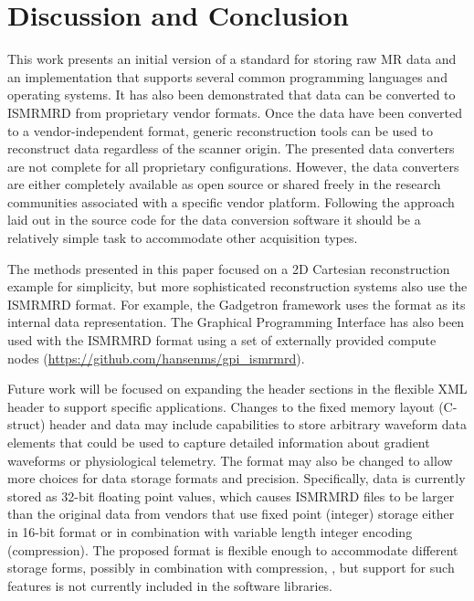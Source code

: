 \documentclass[12pt, draft]{article}
\newcommand{\madded}[2][None]{\added[remark=#1]{#2}}
\begin{document}
\section*{Discussion and Conclusion}
This work presents an initial version of a standard for storing raw MR data and an implementation that supports several common programming languages and operating systems. It has also been demonstrated that data can be converted to ISMRMRD from proprietary vendor formats. Once the data have been converted to a vendor-independent format, generic reconstruction tools can be used to reconstruct data regardless of the scanner origin. The presented data converters are not complete for all proprietary configurations. However, the data converters are either completely available as open source or shared freely in the research communities associated with a specific vendor platform. Following the approach laid out in the source code for the data conversion software it should be a relatively simple task to accommodate other acquisition types. 

The methods presented in this paper focused on a 2D Cartesian reconstruction example for simplicity, but more sophisticated reconstruction systems also use the ISMRMRD format. For example, the Gadgetron \cite{Hansen:2013aa} framework uses the format as its internal data representation. The Graphical Programming Interface \cite{Zwart:2014aa} has also been used with the ISMRMRD format using a set of externally provided compute nodes (\url{https://github.com/hansenms/gpi_ismrmrd}).

Future work will be focused on expanding the header sections in the flexible XML header to support specific applications. Changes to the fixed memory layout (C-struct) header and data may include capabilities to store arbitrary waveform data elements that could be used to capture detailed information about gradient waveforms or physiological telemetry. The format may also be changed to allow more choices for data storage formats and precision. Specifically, data is currently stored as 32-bit floating point values, which causes ISMRMRD files to be larger than the original data from vendors that use fixed point (integer) storage either in 16-bit format or in combination with variable length integer encoding (compression). The proposed format is flexible enough to accommodate different storage forms, possibly in combination with compression, \madded[R2.27]{which is easily supported by HDF5}, but support for such features is not currently included in the software libraries.  
\end{document}
